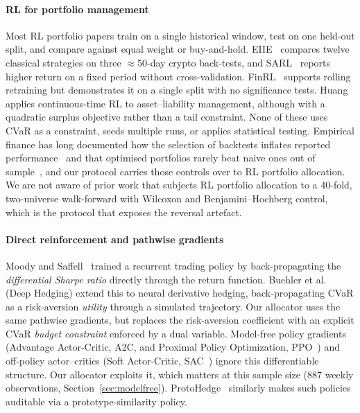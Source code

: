\documentclass[sigconf]{acmart}
\begin{document}
\paragraph{RL for portfolio management}
Most RL portfolio papers train on a single historical window, test on one held-out split,
and compare against equal weight or buy-and-hold. EIIE~\cite{jiang2017deep} compares twelve classical strategies on three
$\approx$50-day crypto back-tests, and SARL~\cite{ye2020sarl} reports higher return on a fixed
period without cross-validation. FinRL~\cite{liu2021finrl} supports rolling retraining but
demonstrates it on a single split with no significance tests. Huang~\cite{huang2025ctrl}
applies continuous-time RL to asset--liability management, although with a quadratic
surplus objective rather than a tail constraint. None of these uses CVaR as a constraint,
seeds multiple runs, or applies statistical testing. Empirical finance has long documented
how the selection of backtests inflates reported
performance~\cite{white2000reality,harvey2016cross,bailey2017pbo} and that optimised portfolios
rarely beat naive ones out of sample~\cite{demiguel2009optimal}, and our protocol carries
those controls over to RL portfolio allocation. We are not aware of prior work that subjects
RL portfolio allocation to a 40-fold, two-universe walk-forward with Wilcoxon and
Benjamini--Hochberg control, which is the protocol that exposes the reversal artefact.

\paragraph{Direct reinforcement and pathwise gradients}
Moody and Saffell~\cite{moody2001learning} trained a recurrent trading policy by
back-propagating the \emph{differential Sharpe ratio} directly through the return
function. Buehler et al.~\cite{buehler2019deephedging} (Deep Hedging) extend this to
neural derivative hedging, back-propagating CVaR as a risk-aversion \emph{utility}
through a simulated trajectory. Our allocator uses the same pathwise gradients, but replaces
the risk-aversion coefficient with an explicit CVaR
\emph{budget constraint} enforced by a dual variable. Model-free policy gradients
(Advantage Actor-Critic, A2C, and Proximal Policy Optimization,
PPO~\cite{schulman2017ppo}) and off-policy actor--critics
(Soft Actor-Critic, SAC~\cite{haarnoja2018soft}) ignore this differentiable structure. Our allocator
exploits it, which matters at this sample size (887 weekly observations,
Section~\ref{sec:modelfree}). ProtoHedge~\cite{faloughi2025protohedge} similarly makes
such policies auditable via a prototype-similarity policy.
\end{document}
